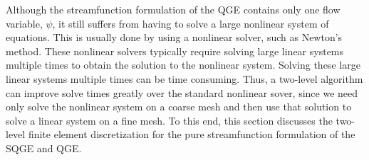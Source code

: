 Although the streamfunction formulation of the QGE contains only one flow
variable, $\psi$, it still suffers from having to solve a large nonlinear system
of equations. This is usually done by using a nonlinear solver, such as Newton's
method. These nonlinear solvers typically require solving large linear systems
multiple times to obtain the solution to the nonlinear system. Solving these
large linear systems multiple times can be time consuming. Thus, a two-level
algorithm can improve solve times greatly over the standard nonlinear sover,
since we need only solve the nonlinear system on a coarse mesh and then use that
solution to solve a linear system on a fine mesh. To this end, this section
discusses the two-level finite element discretization for the pure
streamfunction formulation of the SQGE and QGE.
